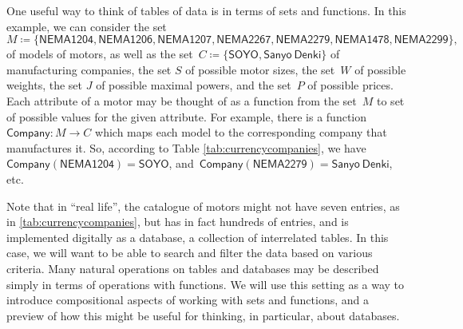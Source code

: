 \begin{comment}
\begin{table}[h]
    \centering
    \begin{tabular}{c|c|c|c|c|c}
         Motor ID & Company& Size & \unit[Weight]{[g]} & \unit[Max Power]{[W]} & \unit[price]{[USD]} \\
         \hline
         $\mathsf{Model1}$&Company $\mathsf{B}$ & 2 x 3 x 4& 10 & &259\\
         $\mathsf{Model2}$&Company $\mathsf{A}$ &2 x 3 x 4& 20 & &109\\
         $\mathsf{Model3}$&Company $\mathsf{B}$ &2 x 3 x 4& 5 & &124\\
         $\mathsf{Model4}$&Company $\mathsf{C}$ &2 x 3 x 4& 30 & &399\\
         $\mathsf{Model5}$&Company $\mathsf{A}$ &2 x 3 x 4& 45 & &245  \\
        $\mathsf{Model6}$&Company $\mathsf{D}$ & 2 x 3 x 4& 20 & &89\\
        $\mathsf{Model7}$&Company $\mathsf{B}$ & 2 x 3 x 4& 15 &&130
    \end{tabular}
    \caption{A simplified catalogue of motors.}
    \label{tab:currencycompanies}
\end{table}
\end{comment}
One useful way to think of tables of data is in terms of sets and functions. In this example, we can consider the set
\begin{equation*}
M \coloneqq \{ \mathsf{NEMA1204}, \mathsf{NEMA1206}, \mathsf{NEMA1207}, \mathsf{NEMA2267}, \mathsf{NEMA2279}, \mathsf{NEMA1478}, \mathsf{NEMA2299} \},
\end{equation*}
of models of motors, as well as the set~$C \coloneqq \{ \mathsf{SOYO}, \mathsf{Sanyo \ Denki}\}$ of manufacturing companies, the set $S$ of possible motor sizes, the set~$W$ of possible weights, the set $J$ of possible maximal powers, and the set~$P$ of possible prices. Each attribute of a motor may be thought of as a function from the set~$M$ to set of possible values for the given attribute. For example, there is a function~$\mathsf{Company}\colon M \to C$ which maps each model to the corresponding company that manufactures it. So, according to Table \ref{tab:currencycompanies}, we have ~$\mathsf{Company}(\mathsf{NEMA1204}) = \mathsf{SOYO}$, and~$\mathsf{Company}(\mathsf{NEMA2279}) = \mathsf{Sanyo \ Denki}$, etc.

Note that in ``real life'', the catalogue of motors might not have seven entries, as in \cref{tab:currencycompanies}, but has in fact hundreds of entries, and is implemented digitally as a database,  a collection of interrelated tables. In this case, we will want to be able to search and filter the data based on various criteria. Many natural operations on tables and databases may be described simply in terms of operations with functions. We will use this setting as a way to introduce compositional aspects of working with sets and functions, and a preview of how this might be useful for thinking, in particular, about databases.

